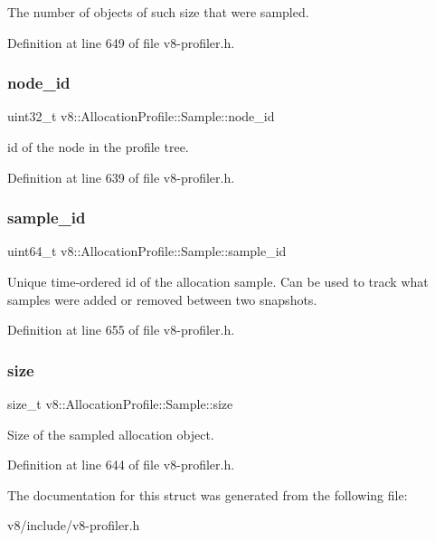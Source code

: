The number of objects of such size that were sampled. 

Definition at line 649 of file v8-\/profiler.\+h.

\mbox{\label{structv8_1_1AllocationProfile_1_1Sample_ab84cfd942c2b6d42f25874b5008cfc35}} 
\subsubsection{\texorpdfstring{node\+\_\+id}{node\_id}}
{\footnotesize\ttfamily uint32\+\_\+t v8\+::\+Allocation\+Profile\+::\+Sample\+::node\+\_\+id}

id of the node in the profile tree. 

Definition at line 639 of file v8-\/profiler.\+h.

\mbox{\label{structv8_1_1AllocationProfile_1_1Sample_afc21641115d4a9684363ac873750422c}} 
\subsubsection{\texorpdfstring{sample\+\_\+id}{sample\_id}}
{\footnotesize\ttfamily uint64\+\_\+t v8\+::\+Allocation\+Profile\+::\+Sample\+::sample\+\_\+id}

Unique time-\/ordered id of the allocation sample. Can be used to track what samples were added or removed between two snapshots. 

Definition at line 655 of file v8-\/profiler.\+h.

\mbox{\label{structv8_1_1AllocationProfile_1_1Sample_aa8775ce782c6fcc5a20922f604190dd5}} 
\subsubsection{\texorpdfstring{size}{size}}
{\footnotesize\ttfamily size\+\_\+t v8\+::\+Allocation\+Profile\+::\+Sample\+::size}

Size of the sampled allocation object. 

Definition at line 644 of file v8-\/profiler.\+h.



The documentation for this struct was generated from the following file\+:\begin{DoxyCompactItemize}
\item 
v8/include/v8-\/profiler.\+h\end{DoxyCompactItemize}
